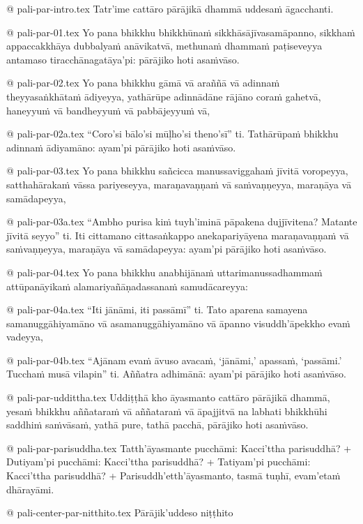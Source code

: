 @ pali-par-intro.tex
﻿Tatr’ime cattāro pārājikā dhammā uddesaṁ āgacchanti.

@ pali-par-01.tex
Yo pana bhikkhu bhikkhūnaṁ sikkhāsājīvasamāpanno, sikkhaṁ appaccakkhāya dubbalyaṁ anāvikatvā, methunaṁ dhammaṁ paṭiseveyya antamaso tiracchānagatāya’pi: pārājiko hoti asaṁvāso.

@ pali-par-02.tex
Yo pana bhikkhu gāmā vā araññā vā adinnaṁ theyyasaṅkhātaṁ ādiyeyya, yathārūpe adinnādāne rājāno coraṁ gahetvā, haneyyuṁ vā bandheyyuṁ vā pabbājeyyuṁ vā,

@ pali-par-02a.tex
“Coro’si bālo’si mūḷho’si theno’sī” ti. Tathārūpaṁ bhikkhu adinnaṁ ādiyamāno: ayam’pi pārājiko hoti asaṁvāso.

@ pali-par-03.tex
Yo pana bhikkhu sañcicca manussaviggahaṁ jīvitā voropeyya, satthahārakaṁ vāssa pariyeseyya, maraṇavaṇṇaṁ vā saṁvaṇṇeyya, maraṇāya vā samādapeyya,

@ pali-par-03a.tex
“Ambho purisa kiṁ tuyh’iminā pāpakena dujjīvitena? Matante jīvitā seyyo” ti. Iti cittamano cittasaṅkappo anekapariyāyena maraṇavaṇṇaṁ vā saṁvaṇṇeyya, maraṇāya vā samādapeyya: ayam’pi pārājiko hoti asaṁvāso.

@ pali-par-04.tex
Yo pana bhikkhu anabhijānaṁ uttarimanussadhammaṁ attūpanāyikaṁ alamariyañāṇadassanaṁ samudācareyya:

@ pali-par-04a.tex
“Iti jānāmi, iti passāmī” ti. Tato aparena samayena samanuggāhiyamāno vā asamanuggāhiyamāno vā āpanno visuddh’āpekkho evaṁ vadeyya, 

@ pali-par-04b.tex
“Ajānam evaṁ āvuso avacaṁ, ‘jānāmi,’ apassaṁ, ‘passāmi.’ Tucchaṁ musā vilapin” ti. Aññatra adhimānā: ayam’pi pārājiko hoti asaṁvāso.

@ pali-par-uddittha.tex
Uddiṭṭhā kho āyasmanto cattāro pārājikā dhammā, yesaṁ bhikkhu aññataraṁ vā aññataraṁ vā āpajjitvā na labhati bhikkhūhi saddhiṁ saṁvāsaṁ, yathā pure, tathā pacchā, pārājiko hoti asaṁvāso.

@ pali-par-parisuddha.tex
Tatth’āyasmante pucchāmi: Kacci’ttha parisuddhā? +
Dutiyam’pi pucchāmi: Kacci’ttha parisuddhā? +
Tatiyam’pi pucchāmi: Kacci’ttha parisuddhā? +
Parisuddh’etth’āyasmanto, tasmā tuṇhī, evam’etaṁ dhārayāmi.

@ pali-center-par-nitthito.tex
Pārājik’uddeso niṭṭhito
